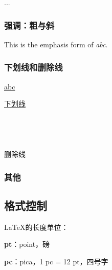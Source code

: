 \documentclass{ctexart}
\begin{document}
            ...

	    \subsubsection{强调：粗与斜}
            This is the emphasis form of \emph{abc}.
    
	    \subsubsection{下划线和删除线}
            \underline{abc} 
		
            \uline{下划线}\\
            \\
            \\
            \\
            \\
            \sout{删除线}\\

        \subsubsection{其他}
    
    \subsection{格式控制}
            \LaTeX 的长度单位：

            \textbf{pt}：point，磅

            \textbf{pc}：pica，1 pc = 12 pt，四号字
\end{document}
